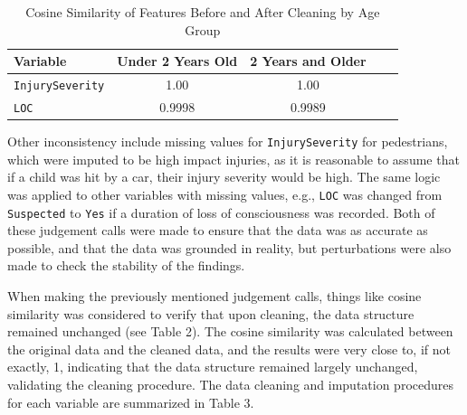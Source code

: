\documentclass[10pt,letterpaper]{article}
\begin{document}
\begin{scriptsize}
\begin{longtable}{p{3cm} c c c c}
\caption{Cosine Similarity of Features Before and After Cleaning by Age Group} 
\label{tab:cosine_similarity_age} \\

\toprule
\textbf{Variable} & {\textbf{Under 2 Years Old}} & {\textbf{2 Years and Older}} \\
\midrule
\endhead

\bottomrule
\endfoot

\texttt{InjurySeverity} & 1.00 & 1.00 \\
\midrule
\texttt{LOC} &  0.9998 & 0.9989 \\

\end{longtable}
\end{scriptsize}

Other inconsistency include missing values for \texttt{InjurySeverity} for pedestrians, which were imputed to be high impact injuries, as it is reasonable to assume that if a child was hit by a car, their injury severity would be high. The same logic was applied to other variables with missing values, e.g., \texttt{LOC} was changed from \texttt{Suspected} to \texttt{Yes} if a duration of loss of consciousness was recorded. Both of these judgement calls were made to ensure that the data was as accurate as possible, and that the data was grounded in reality, but perturbations were also made to check the stability of the findings.

When making the previously mentioned judgement calls, things like cosine similarity was considered to verify that upon cleaning, the data structure remained unchanged (see Table 2). The cosine similarity was calculated between the original data and the cleaned data, and the results were very close to, if not exactly, 1, indicating that the data structure remained largely unchanged, validating the cleaning procedure. The data cleaning and imputation procedures for each variable are summarized in Table 3.
\end{document}
